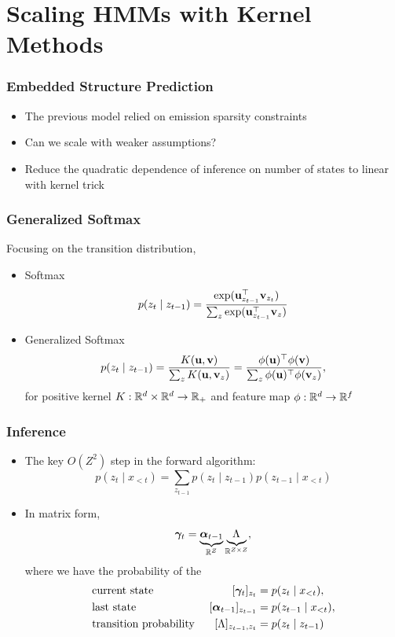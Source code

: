 \documentclass{beamer}
\begin{document}
\section{Scaling HMMs with Kernel Methods}

\begin{frame}
\frametitle{Embedded Structure Prediction}
\begin{itemize}
\item The previous model relied on emission sparsity constraints
\vspace{2em}
\item Can we scale with weaker assumptions?
\vspace{2em}
\item Reduce the quadratic dependence of inference on number of states
    to linear with kernel trick
\end{itemize}
\end{frame}

\begin{frame}
\frametitle{Generalized Softmax}
Focusing on the transition distribution,
\vspace{1em}
\begin{itemize}
\item Softmax
$$p(z_t \mid z_{t-1}) = \frac{\exp(\mathbf{u}_{z_{t-1}}^\top \mathbf{v}_{z_{t}})}
{\sum_z \exp(\mathbf{u}_{z_{t-1}}^\top \mathbf{v}_z)}$$
\vspace{1em}
\item Generalized Softmax
$$p(z_t \mid z_{t-1})
= \frac{K(\mathbf{u}, \mathbf{v})}{\sum_z K(\mathbf{u},\mathbf{v}_z)}
= \frac{\phi(\mathbf{u})^\top\phi(\mathbf{v})}
    {\sum_z \phi(\mathbf{u})^\top\phi(\mathbf{v}_z)},$$
for positive kernel $K:\mathbb{R}^d\times\mathbb{R}^d\to\mathbb{R}_+$
and feature map $\phi:\mathbb{R}^d\to\mathbb{R}^f$
\end{itemize}
\end{frame}

\begin{frame}
\frametitle{Inference}
\begin{itemize}
\item The key $O(Z^2)$ step in the forward algorithm:
$$
p(z_t \mid x_{<t}) = \sum_{z_{t-1}} p(z_t \mid z_{t-1})p(z_{t-1} \mid x_{<t})
$$
\vspace{1em}
\item In matrix form, 
\begin{equation*}
\bm\gamma_t = \underbrace{\bm\alpha_{t-1}}_{\mathbb{R}^Z}\underbrace{\Lambda_{}}_{\mathbb{R}^{Z \times Z}},
\end{equation*}
where we have the probability of the
\begin{align*}
&\textnormal{current state } & [\bm\gamma_{t}]_{z_{t}} &= p(z_{t} \mid x_{< t}),\\
&\textnormal{last state } & [\bm\alpha_{t-1}]_{z_{t-1}} &= p(z_{t-1} \mid x_{< t}),\\
&\textnormal{transition probability } & [\Lambda]_{z_{t-1},z_t} &= p(z_t\mid z_{t-1})
\end{align*}
\end{itemize}
\end{frame}
\end{document}

